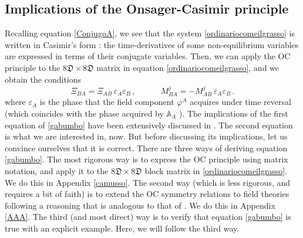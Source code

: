 \documentclass[a4paper, amsfonts, amssymb, amsmath, reprint, showkeys, nofootinbib, twoside, onecolumn,notitlepage]{revtex4-1}
\newcommand{\spc}{\quad \quad \quad}
\begin{document}
\subsection{Implications of the Onsager-Casimir principle}

Recalling equation \eqref{ConjugoA}, we see that the system \eqref{ordinariocomeilgrasso} is written in Casimir's form \cite{landau5}: the time-derivatives of some non-equilibrium variables are expressed in terms of their conjugate variables. Then, we can apply the OC principle to the $8\mathfrak{D}\times 8\mathfrak{D}$ matrix in equation \eqref{ordinariocomeilgrasso}, and we obtain the conditions
\begin{equation}\label{gabumbo}
 \Xi_{BA}= \Xi_{AB} \, \varepsilon_A \varepsilon_B \, , \spc
 M^j_{BA}= {-}M^j_{AB} \, \varepsilon_A \varepsilon_B \, .
\end{equation}
where $\varepsilon_A$ is the phase that the field component $\varphi^A$ acquires under time reversal (which coincides with the phase acquired by $\mathbb{A}_A$ \cite{Onsager_Casimir}). The implications of the first equation of \eqref{gabumbo} have been extensively discussed in \cite{GavassinoNonHydro2022}. The second equation is what we are interested in, now. But before discussing its implications, let us convince ourselves that it is correct. 
There are three ways of deriving equation \eqref{gabumbo}. The most rigorous way is to express the OC principle using matrix notation, and apply it to the $8\mathfrak{D}\times 8\mathfrak{D}$ block matrix in \eqref{ordinariocomeilgrasso}. We do this in Appendix \ref{camusso}. The second way (which is less rigorous, and requires a bit of faith) is to extend the OC symmetry relations to field theories following a reasoning that is analogous to that of \citet{Onsager_Casimir}. We do this in Appendix \ref{AAA}. The third (and most direct) way is to verify that equation \eqref{gabumbo} is true with an explicit example. Here, we will follow the third way. 
\end{document}
